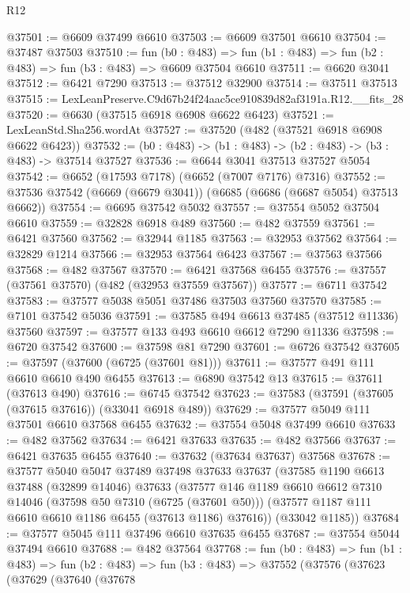 \begin{lexlean}{R12}
\begin{coremodule}
@37501 := @6609 @37499 @6610
@37503 := @6609 @37501 @6610
@37504 := @37487 @37503
@37510 := fun (b0 : @483) =>
  fun (b1 : @483) => fun (b2 : @483) => fun (b3 : @483) => @6609 @37504 @6610
@37511 := @6620 @3041
@37512 := @6421 @7290
@37513 := @37512 @32900
@37514 := @37511 @37513
@37515 := LexLeanPreserve.C9d67b24f24aac5ce910839d82af3191a.R12.__fits_28
@37520 := @6630 (@37515 @6918 @6908 @6622 @6423)
@37521 := LexLeanStd.Sha256.wordAt
@37527 := @37520 (@482 (@37521 @6918 @6908 @6622 @6423))
@37532 := (b0 : @483) -> (b1 : @483) -> (b2 : @483) -> (b3 : @483) -> @37514 @37527
@37536 := @6644 @3041 @37513 @37527 @5054
@37542 := @6652 (@17593 @7178) (@6652 (@7007 @7176) @7316)
@37552 := @37536 @37542 (@6669 (@6679 @3041)) (@6685 (@6686 (@6687 @5054) @37513 @6662))
@37554 := @6695 @37542 @5032
@37557 := @37554 @5052 @37504 @6610
@37559 := @32828 @6918 @489
@37560 := @482 @37559
@37561 := @6421 @37560
@37562 := @32944 @1185
@37563 := @32953 @37562
@37564 := @32829 @1214
@37566 := @32953 @37564 @6423
@37567 := @37563 @37566
@37568 := @482 @37567
@37570 := @6421 @37568 @6455
@37576 := @37557 (@37561 @37570) (@482 (@32953 @37559 @37567))
@37577 := @6711 @37542
@37583 := @37577 @5038 @5051 @37486 @37503 @37560 @37570
@37585 := @7101 @37542 @5036
@37591 := @37585 @494 @6613 @37485 (@37512 @11336) @37560
@37597 := @37577 @133 @493 @6610 @6612 @7290 @11336
@37598 := @6720 @37542
@37600 := @37598 @81 @7290
@37601 := @6726 @37542
@37605 := @37597 (@37600 (@6725 (@37601 @81)))
@37611 := @37577 @491 @111 @6610 @6610 @490 @6455
@37613 := @6890 @37542 @13
@37615 := @37611 (@37613 @490)
@37616 := @6745 @37542
@37623 := @37583 (@37591 (@37605 (@37615 @37616)) (@33041 @6918 @489))
@37629 := @37577 @5049 @111 @37501 @6610 @37568 @6455
@37632 := @37554 @5048 @37499 @6610
@37633 := @482 @37562
@37634 := @6421 @37633
@37635 := @482 @37566
@37637 := @6421 @37635 @6455
@37640 := @37632 (@37634 @37637) @37568
@37678 := @37577
    @5040
    @5047
    @37489
    @37498
    @37633
    @37637
    (@37585
      @1190
      @6613
      @37488
      (@32899 @14046)
      @37633
      (@37577
        @146
        @1189
        @6610
        @6612
        @7310
        @14046
        (@37598 @50 @7310 (@6725 (@37601 @50)))
        (@37577 @1187 @111 @6610 @6610 @1186 @6455 (@37613 @1186) @37616))
      (@33042 @1185))
@37684 := @37577 @5045 @111 @37496 @6610 @37635 @6455
@37687 := @37554 @5044 @37494 @6610
@37688 := @482 @37564
@37768 := fun (b0 : @483) =>
  fun (b1 : @483) =>
  fun (b2 : @483) =>
  fun (b3 : @483) =>
  @37552
    (@37576
      (@37623
        (@37629
          (@37640
            (@37678

\end{coremodule}
\end{lexlean}
